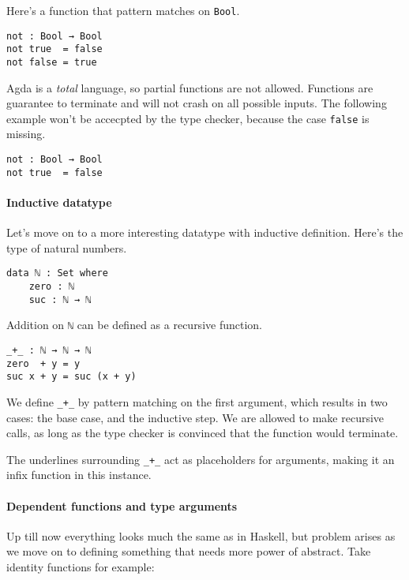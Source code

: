 \documentclass[14pt, a4paper]{article}
\begin{document}
Here's a function that pattern matches on {\lstinline|Bool|}.

\begin{lstlisting}
not : Bool → Bool
not true  = false
not false = true
\end{lstlisting}

Agda is a \textit{total} language, so partial functions are not allowed. Functions
are guarantee to terminate and will not crash on all possible inputs. The following
example won't be accecpted by the type checker, because the case {\lstinline|false|} is missing.

\begin{lstlisting}
not : Bool → Bool
not true  = false
\end{lstlisting}

\paragraph{Inductive datatype} Let's move on to a more interesting datatype with inductive definition. Here's the type of natural numbers.
\begin{lstlisting}
data ℕ : Set where
    zero : ℕ
    suc : ℕ → ℕ
\end{lstlisting}

Addition on {\lstinline|ℕ|} can be defined as a recursive function.

\begin{lstlisting}
_+_ : ℕ → ℕ → ℕ
zero  + y = y
suc x + y = suc (x + y)
\end{lstlisting}

We define {\lstinline|_+_|} by pattern matching on the first argument, which results
in two cases: the base case, and the inductive step. We are allowed to make
recursive calls, as long as the type checker is convinced that the function
would terminate.

The underlines surrounding {\lstinline|_+_|} act as placeholders for arguments, making
it an infix function in this instance.

\paragraph{Dependent functions and type arguments}
Up till now everything looks much the same as in Haskell, but problem arises as
we move on to defining something that needs more power of abstract. Take identity
functions for example:
\end{document}
